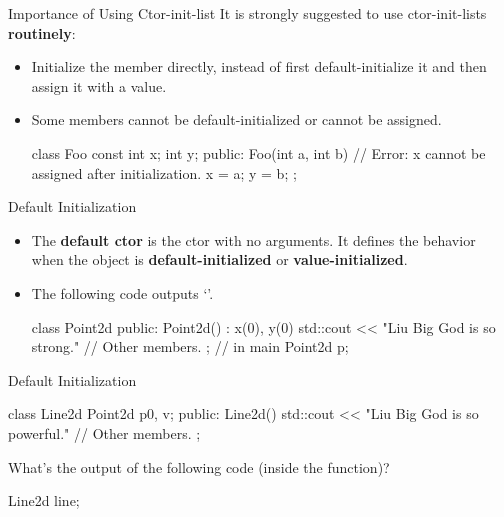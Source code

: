 \documentclass{beamer}
\begin{document}
\begin{frame}[fragile]{Importance of Using Ctor-init-list}
    It is strongly suggested to use ctor-init-lists \textbf{routinely}:
    \begin{itemize}
        \item Initialize the member directly, instead of first default-initialize it and then assign it with a value.
        \item Some members cannot be default-initialized or cannot be assigned.
        \begin{cpp}
class Foo {
  const int x;
  int y;
 public:
  Foo(int a, int b) {
    // Error: x cannot be assigned after initialization.
    x = a;
    y = b;
  }
};
        \end{cpp}
    \end{itemize}
\end{frame}

\begin{frame}[fragile]{Default Initialization}
    \begin{itemize}
        \item The \textbf{default ctor} is the ctor with no arguments. It defines the behavior when the object is \textbf{default-initialized} or \textbf{value-initialized}.
        \item The following code outputs `'.
        \begin{cpp}
class Point2d {
 public:
  Point2d() : x(0), y(0) {
    std::cout << "Liu Big God is so strong.\n"
  }
  // Other members.
};
// in main
Point2d p;
        \end{cpp}
    \end{itemize}
\end{frame}

\begin{frame}[fragile]{Default Initialization}
    \begin{cpp}
class Line2d {
  Point2d p0, v;
 public:
  Line2d()
    { std::cout << "Liu Big God is so powerful.\n" }
  // Other members.
};
    \end{cpp}
    What's the output of the following code (inside the  function)?
    \begin{cpp}
Line2d line;
    \end{cpp}
    \pause
    \\
    \\
\end{frame}
\end{document}
